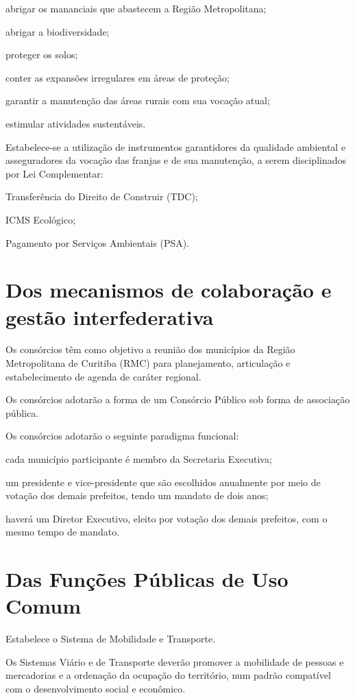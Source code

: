 \documentclass[capitulo]{br-lex-2017}
\begin{document}
		\inciso abrigar os mananciais que abastecem a Região Metropolitana;
		
		\inciso abrigar a biodiversidade;
		
		\inciso proteger os solos;
		
		\inciso conter as expansões irregulares em áreas de proteção;
		
		\inciso garantir a manutenção das áreas rurais com sua vocação atual;
		
		\inciso estimular atividades sustentáveis.

\artigo Estabelece-se a utilização de instrumentos garantidores da qualidade ambiental e asseguradores da vocação das franjas e de sua manutenção, a serem disciplinados por Lei Complementar:

\inciso Transferência do Direito de Construir (TDC);

\inciso ICMS Ecológico;

\inciso Pagamento por Serviços Ambientais (PSA).

\chapter{Dos mecanismos de colaboração e gestão interfederativa}

\artigo Os consórcios têm como objetivo a reunião dos municípios da Região Metropolitana de Curitiba (RMC) para planejamento, articulação e estabelecimento de agenda de caráter regional.

\paragrafo Os consórcios adotarão a forma de um Consórcio Público sob forma de associação pública.

\paragrafo Os consórcios adotarão o seguinte paradigma funcional:

\inciso cada município participante é membro da Secretaria Executiva;

\inciso um presidente e vice-presidente que são escolhidos anualmente por meio de votação dos demais prefeitos, tendo um mandato de dois anos;

\inciso haverá um Diretor Executivo, eleito por votação dos demais prefeitos, com o mesmo tempo de mandato.

\chapter{Das Funções Públicas de Uso Comum}

\artigo Estabelece o Sistema de Mobilidade e Transporte.

\paragrafo Os Sistemas Viário e de Transporte deverão promover a mobilidade de pessoas e mercadorias e a ordenação da ocupação do território, num padrão compatível com o desenvolvimento social e econômico.
\end{document}
